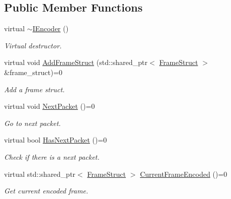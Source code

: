 \subsection*{Public Member Functions}
\begin{DoxyCompactItemize}
\item 
\mbox{\label{classmoetsi_1_1ssp_1_1IEncoder_a6c19808ebe6a05dbce630c45188b9346}} 
virtual \hyperlink{classmoetsi_1_1ssp_1_1IEncoder_a6c19808ebe6a05dbce630c45188b9346}{$\sim$\+I\+Encoder} ()
\begin{DoxyCompactList}\small\item\em Virtual destructor. \end{DoxyCompactList}\item 
virtual void \hyperlink{classmoetsi_1_1ssp_1_1IEncoder_a8c223ec82fdd30ee8ee75157306054ec}{Add\+Frame\+Struct} (std\+::shared\+\_\+ptr$<$ \hyperlink{structmoetsi_1_1ssp_1_1FrameStruct}{Frame\+Struct} $>$ \&frame\+\_\+struct)=0
\begin{DoxyCompactList}\small\item\em Add a frame struct. \end{DoxyCompactList}\item 
\mbox{\label{classmoetsi_1_1ssp_1_1IEncoder_afac3ddcf2f49be16020c83cb9e0fb274}} 
virtual void \hyperlink{classmoetsi_1_1ssp_1_1IEncoder_afac3ddcf2f49be16020c83cb9e0fb274}{Next\+Packet} ()=0
\begin{DoxyCompactList}\small\item\em Go to next packet. \end{DoxyCompactList}\item 
virtual bool \hyperlink{classmoetsi_1_1ssp_1_1IEncoder_a2af8e23d841ef61f6ee4037e56a3694d}{Has\+Next\+Packet} ()=0
\begin{DoxyCompactList}\small\item\em Check if there is a next packet. \end{DoxyCompactList}\item 
virtual std\+::shared\+\_\+ptr$<$ \hyperlink{structmoetsi_1_1ssp_1_1FrameStruct}{Frame\+Struct} $>$ \hyperlink{classmoetsi_1_1ssp_1_1IEncoder_a178d117518e7c7007414ea9c82bd3ed6}{Current\+Frame\+Encoded} ()=0
\begin{DoxyCompactList}\small\item\em Get current encoded frame. \end{DoxyCompactList}\item 

\end{DoxyCompactItemize}

